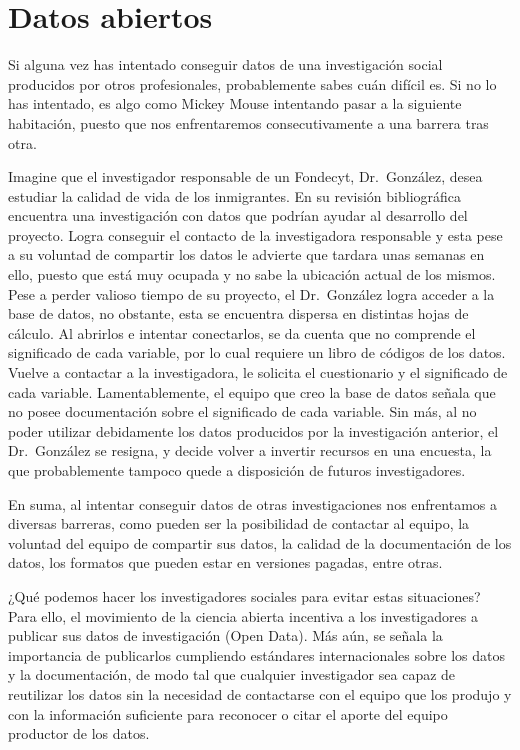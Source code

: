 \documentclass[
  spanish,
  a4paper,
  oneside]{scrbook}
\begin{document}
\part{Datos abiertos}

Si alguna vez has intentado conseguir datos de una investigación social
producidos por otros profesionales, probablemente sabes cuán difícil es.
Si no lo has intentado, es algo como Mickey Mouse intentando pasar a la
siguiente habitación, puesto que nos enfrentaremos consecutivamente a
una barrera tras otra.

Imagine que el investigador responsable de un Fondecyt, Dr.~González,
desea estudiar la calidad de vida de los inmigrantes. En su revisión
bibliográfica encuentra una investigación con datos que podrían ayudar
al desarrollo del proyecto. Logra conseguir el contacto de la
investigadora responsable y esta pese a su voluntad de compartir los
datos le advierte que tardara unas semanas en ello, puesto que está muy
ocupada y no sabe la ubicación actual de los mismos. Pese a perder
valioso tiempo de su proyecto, el Dr.~González logra acceder a la base
de datos, no obstante, esta se encuentra dispersa en distintas hojas de
cálculo. Al abrirlos e intentar conectarlos, se da cuenta que no
comprende el significado de cada variable, por lo cual requiere un libro
de códigos de los datos. Vuelve a contactar a la investigadora, le
solicita el cuestionario y el significado de cada variable.
Lamentablemente, el equipo que creo la base de datos señala que no posee
documentación sobre el significado de cada variable. Sin más, al no
poder utilizar debidamente los datos producidos por la investigación
anterior, el Dr.~González se resigna, y decide volver a invertir
recursos en una encuesta, la que probablemente tampoco quede a
disposición de futuros investigadores.

En suma, al intentar conseguir datos de otras investigaciones nos
enfrentamos a diversas barreras, como pueden ser la posibilidad de
contactar al equipo, la voluntad del equipo de compartir sus datos, la
calidad de la documentación de los datos, los formatos que pueden estar
en versiones pagadas, entre otras.

¿Qué podemos hacer los investigadores sociales para evitar estas
situaciones? Para ello, el movimiento de la ciencia abierta incentiva a
los investigadores a publicar sus datos de investigación (Open Data).
Más aún, se señala la importancia de publicarlos cumpliendo estándares
internacionales sobre los datos y la documentación, de modo tal que
cualquier investigador sea capaz de reutilizar los datos sin la
necesidad de contactarse con el equipo que los produjo y con la
información suficiente para reconocer o citar el aporte del equipo
productor de los datos.
\end{document}
